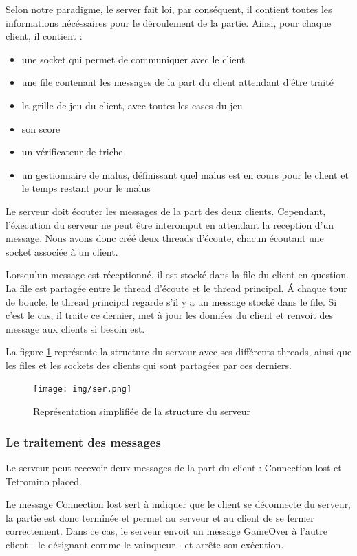 \documentclass[a4paper, 12pt]{article}
\begin{document}
		Selon notre paradigme, le server fait loi, par conséquent, il contient toutes les informations nécéssaires pour le déroulement de la partie. Ainsi, pour chaque client, il contient : 
			\begin{itemize}
				\item une socket qui permet de communiquer avec le client
				\item une file contenant les messages de la part du client attendant d'être traité
				\item la grille de jeu du client, avec toutes les cases du jeu
				\item son score
				\item un vérificateur de triche
				\item un gestionnaire de malus, définissant quel malus est en cours pour le client et le temps restant pour le malus
			\end{itemize}

		Le serveur doit écouter les messages de la part des deux clients. Cependant, l'éxecution du serveur ne peut être interomput en attendant la reception d'un message. Nous avons donc créé deux threads d'écoute, chacun écoutant une socket associée à un client. 

		Lorsqu'un message est réceptionné, il est stocké dans la file du client en question. La file est partagée entre le thread d'écoute et le thread principal. \'A chaque tour de boucle, le thread principal regarde s'il y a un message stocké dans le file. Si c'est le cas, il traite ce dernier, met à jour les données du client et renvoit des message aux clients si besoin est.

		La figure \ref{fig:ser} représente la structure du serveur avec ses différents threads, ainsi que les files et les sockets des clients qui sont partagées par ces derniers.

		\begin{figure}[bt]
			\centering
			\texttt{[image: img/ser.png]}
			\caption{Représentation simplifiée de la structure du serveur}
			\label{fig:ser}
		\end{figure}

		\subsubsection{Le traitement des messages}
			Le serveur peut recevoir deux messages de la part du client : Connection lost et Tetromino placed.

			Le message Connection lost sert à indiquer que le client se déconnecte du serveur, la partie est donc terminée et permet au serveur et au client de se fermer correctement. Dans ce cas, le serveur envoit un message GameOver à l'autre client - le désignant comme le vainqueur - et arrête son exécution.
\end{document}
